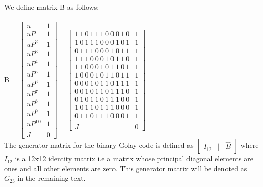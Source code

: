We define matrix B as follows:\\\\
\tab \tab \tab B = $ \begin{bmatrix}u & 1 \\u P & 1 \\u P^2 & 1\\u P^3 & 1\\u P^4 & 1\\u P^5 & 1\\u P^6 & 1\\u P^7 & 1\\u P^8 & 1\\u P^9 & 1\\u P^{10} & 1\\ & \\J & 0\end{bmatrix} = \begin{bmatrix}1\:1\:0\:1\:1\:1\:0\:0\:0\:1\:0 & 1 \\ 1\:0\:1\:1\:1\:0\:0\:0\:1\:0\:1 & 1 \\ 0\:1\:1\:1\:0\:0\:0\:1\:0\:1\:1 & 1 \\ 1\:1\:1\:0\:0\:0\:1\:0\:1\:1\:0 & 1 \\ 1\:1\:0\:0\:0\:1\:0\:1\:1\:0\:1 & 1 \\ 1\:0\:0\:0\:1\:0\:1\:1\:0\:1\:1 & 1 \\ 0\:0\:0\:1\:0\:1\:1\:0\:1\:1\:1 & 1 \\ 0\:0\:1\:0\:1\:1\:0\:1\:1\:1\:0 & 1 \\
0\:1\:0\:1\:1\:0\:1\:1\:1\:0\:0 & 1 \\ 1\:0\:1\:1\:0\:1\:1\:1\:0\:0\:0 & 1 \\ 0\:1\:1\:0\:1\:1\:1\:0\:0\:0\:1 & 1\\ & \\J & 0\end{bmatrix} $\\

The generator matrix for the binary Golay code is defined as $ \begin{bmatrix} I_{12} & | & \hat{B}\end{bmatrix} $ where $I_{12}$ is a 12x12 identity matrix i.e a matrix whose principal diagonal elements are ones and all other elements are zero. This generator matrix will be denoted as $G_{23}$ in the remaining text.\\

